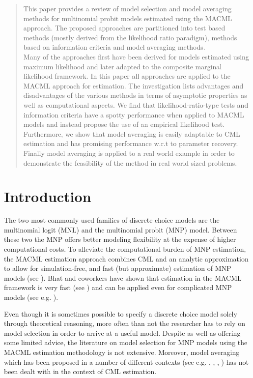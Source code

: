 \documentclass[12pt, a4paper]{article}
\numberwithin{defcounter}{section}
\numberwithin{excounter}{section}
\begin{document}
\begin{abstract}
This paper provides a review of model selection and model averaging 
methods for multinomial probit models estimated using the \ac{MACML} 
approach. The proposed approaches are partitioned into test based 
methods (mostly derived from the likelihood ratio paradigm), methods 
based on information criteria and model averaging methods. 
\\
Many of the approaches first have been derived for models estimated using maximum 
likelihood and later adapted to the composite marginal likelihood 
framework. In this paper all approaches are applied to the \ac{MACML} approach for estimation. The investigation lists advantages and disadvantages of the various methods in terms of asymptotic properties as well as computational aspects. We find that likelihood-ratio-type tests and information criteria have a spotty performance when applied to \ac{MACML} models and instead propose the use of an empirical likelihood test. 
\\
Furthermore, we show that model averaging is easily adaptable to \ac{CML} estimation and has promising performance w.r.t to parameter recovery. Finally model averaging is applied to a real world example in order to demonstrate the feasibility of the method in real world sized problems. 


\end{abstract}
\section{Introduction}
The two most commonly used families of discrete choice models are the  multinomial logit (MNL) and the multinomial probit (\ac{MNP}) model. Between these two the \ac{MNP} offers better modeling flexibility at the expense of higher computational  costs. To alleviate the computational burden of \ac{MNP} estimation, the \ac{MACML} estimation approach combines \ac{CML} and an analytic approximation to allow for simulation-free, and fast (but approximate) estimation of \ac{MNP} models (see \citep{bhat2011}). Bhat and coworkers have shown that estimation in the \ac{MACML} framework is very fast (see \cite{cherchi2016}) and can be  applied even for complicated \ac{MNP} models (see e.g. \cite{kamargianni2015}).

Even though it is sometimes possible to specify a discrete choice model solely through theoretical reasoning, more often than not the researcher has to rely on model selection in order to arrive at a useful model. Despite \cite{bhat2011} as well as \cite{bhat2014} offering some limited advice, the literature on model selection for MNP models using the MACML estimation methodology is not extensive. Moreover, model averaging which has been proposed in a number of different contexts (see e.g. \cite{gao2016}, \cite{hjort2003}, \cite{hansen2007}, \cite{wan2014}) has not been dealt with in the context of \ac{CML} estimation.
\end{document}
